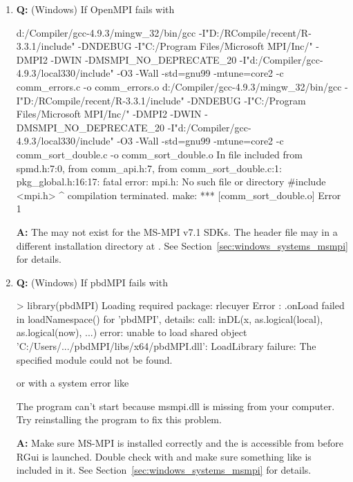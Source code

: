 \begin{enumerate}
\item {\bf\color{blue} Q:}
      (Windows) If OpenMPI  fails with
\begin{Error}
d:/Compiler/gcc-4.9.3/mingw_32/bin/gcc
    -I"D:/RCompile/recent/R-3.3.1/include" -DNDEBUG
    -I"C:/Program Files/Microsoft MPI/Inc/" -DMPI2 -DWIN
    -DMSMPI_NO_DEPRECATE_20    -I"d:/Compiler/gcc-4.9.3/local330/include"
    -O3 -Wall  -std=gnu99 -mtune=core2 -c comm_errors.c -o comm_errors.o
d:/Compiler/gcc-4.9.3/mingw_32/bin/gcc  -I"D:/RCompile/recent/R-3.3.1/include"
    -DNDEBUG -I"C:/Program Files/Microsoft MPI/Inc/" -DMPI2 -DWIN
    -DMSMPI_NO_DEPRECATE_20    -I"d:/Compiler/gcc-4.9.3/local330/include"
    -O3 -Wall  -std=gnu99 -mtune=core2 -c comm_sort_double.c
    -o comm_sort_double.o
In file included from spmd.h:7:0,
                 from comm_api.h:7,
                 from comm_sort_double.c:1:
pkg_global.h:16:17: fatal error: mpi.h: No such file or directory
 #include <mpi.h>
                 ^
compilation terminated.
make: *** [comm_sort_double.o] Error 1
\end{Error}
      {\bf\color{blue} A:}
      The  may not exist for the
      MS-MPI v7.1 SDKs. The header file may in a different installation
      directory at .
      See Section~\ref{sec:windows_systems_msmpi} for details.


\item {\bf\color{blue} Q:}
      (Windows) If pbdMPI fails with
\begin{Error}
> library(pbdMPI)
Loading required package: rlecuyer
Error : .onLoad failed in loadNamespace() for 'pbdMPI', details:
  call: inDL(x, as.logical(local), as.logical(now), ...)
  error: unable to load shared object
         'C:/Users/.../pbdMPI/libs/x64/pbdMPI.dll':
  LoadLibrary failure:  The specified module could not be found.
\end{Error}
or with a system error like
\begin{Error}
The program can't start because msmpi.dll is missing from your
computer. Try reinstalling the program to fix this problem.
\end{Error}
      {\bf\color{blue} A:}
      Make sure MS-MPI is installed correctly and the
       is accessible from 
      before RGui is launched.
      Double check with  and make sure
      something like  is
      included in it.
      See Section~\ref{sec:windows_systems_msmpi} for details.
\end{enumerate}


